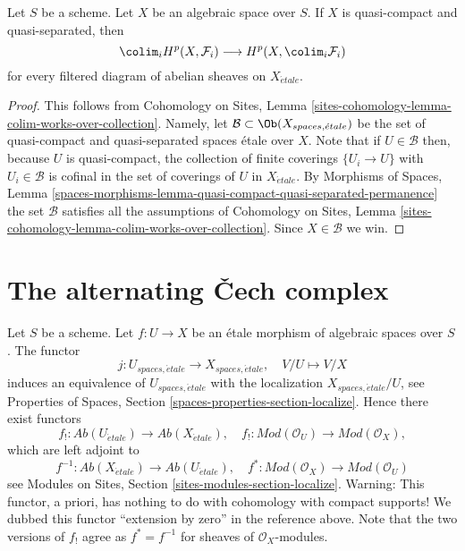 \begin{lemma}
\label{lemma-colimits}
Let $S$ be a scheme. Let $X$ be an algebraic space over $S$.
If $X$ is quasi-compact and quasi-separated, then
$$
\colim_i H^p(X, \mathcal{F}_i)
\longrightarrow
H^p(X, \colim_i \mathcal{F}_i)
$$
for every filtered diagram of abelian sheaves on $X_{\acute{e}tale}$.
\end{lemma}

\begin{proof}
This follows from
Cohomology on Sites, Lemma
\ref{sites-cohomology-lemma-colim-works-over-collection}.
Namely, let $\mathcal{B} \subset \Ob(X_{spaces, \acute{e}tale})$
be the set of quasi-compact and quasi-separated spaces \'etale over $X$.
Note that if $U \in \mathcal{B}$ then, because $U$ is quasi-compact,
the collection of finite coverings $\{U_i \to U\}$ with $U_i \in \mathcal{B}$
is cofinal in the set of coverings of $U$ in $X_{\acute{e}tale}$. By
Morphisms of Spaces, Lemma
\ref{spaces-morphisms-lemma-quasi-compact-quasi-separated-permanence}
the set $\mathcal{B}$ satisfies all the assumptions of
Cohomology on Sites, Lemma
\ref{sites-cohomology-lemma-colim-works-over-collection}.
Since $X \in \mathcal{B}$ we win.
\end{proof}





\section{The alternating {\v C}ech complex}
\label{section-alternating-cech}

\noindent
Let $S$ be a scheme. Let $f : U \to X$ be an \'etale morphism of algebraic
spaces over $S$. The functor
$$
j : U_{spaces, \acute{e}tale} \longrightarrow X_{spaces, \acute{e}tale},\quad
V/U \longmapsto V/X
$$
induces an equivalence of $U_{spaces, \acute{e}tale}$ with the localization
$X_{spaces, \acute{e}tale}/U$, see
Properties of Spaces, Section \ref{spaces-properties-section-localize}.
Hence there exist functors
$$
f_! : \textit{Ab}(U_{\acute{e}tale}) \longrightarrow
\textit{Ab}(X_{\acute{e}tale}),\quad
f_! : \textit{Mod}(\mathcal{O}_U) \longrightarrow \textit{Mod}(\mathcal{O}_X),
$$
which are left adjoint to
$$
f^{-1} : \textit{Ab}(X_{\acute{e}tale}) \longrightarrow
\textit{Ab}(U_{\acute{e}tale}),\quad
f^* : \textit{Mod}(\mathcal{O}_X) \longrightarrow \textit{Mod}(\mathcal{O}_U)
$$
see
Modules on Sites, Section \ref{sites-modules-section-localize}.
Warning: This functor, a priori, has
nothing to do with cohomology with compact supports!
We dubbed this functor ``extension by zero'' in the reference above.
Note that the two versions of $f_!$ agree as $f^* = f^{-1}$ for
sheaves of $\mathcal{O}_X$-modules.

